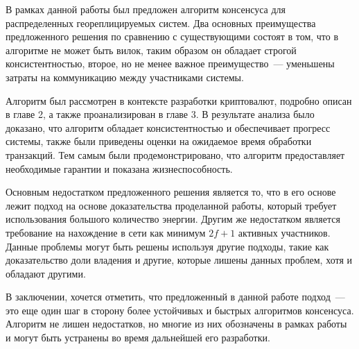 В рамках данной работы был предложен алгоритм консенсуса для распределенных геореплицируемых систем.
Два основных преимущества предложенного решения по сравнению с существующими состоят в том, что в алгоритме не может быть вилок, таким образом он обладает строгой консистентностью, второе, но не менее важное преимущество~--- уменьшены затраты на коммуникацию между участниками системы.

Алгоритм был рассмотрен в контексте разработки криптовалют, подробно описан в главе 2, а также проанализирован в главе 3. В результате анализа было доказано, что алгоритм обладает консистентностью и  обеспечивает прогресс системы, также были приведены оценки на ожидаемое время обработки транзакций. Тем самым были продемонстрировано, что алгоритм предоставляет необходимые гарантии и показана жизнеспособность.

Основным недостатком предложенного решения является то, что в его основе лежит подход на основе доказательства проделанной работы, который требует использования большого количество энергии. Другим же  недостатком является требование на нахождение в сети как минимум $2f+1$ активных участников. Данные проблемы могут быть решены используя другие подходы, такие как доказательство доли владения и другие, которые лишены данных проблем, хотя и обладают другими.

В заключении, хочется отметить, что предложенный в данной работе подход~--- это еще один шаг в сторону более устойчивых и быстрых алгоритмов консенсуса. Алгоритм не лишен недостатков, но многие из них обозначены в рамках работы и могут быть устранены во время дальнейшей  его разработки.